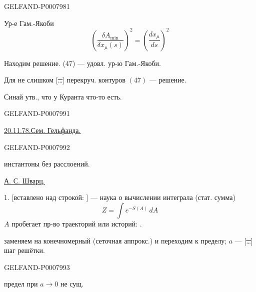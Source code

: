 \begin{GelfandAdjacentEvidence}{GELFAND-P000798}{1}

Ур-е Гам.-Якоби
\[
\left(\frac{\delta A_{\min}}{\delta x_\mu(s)}\right)^2
=\left(\frac{dx_\mu}{ds}\right)^2
\]

Находим решение. (47) --- удовл. ур-ю Гам.-Якоби.

Для не слишком [\sout{\ldots}] перекруч. контуров \((47)\) --- решение.
\end{GelfandAdjacentEvidence}


Синай утв., что у Куранта что-то есть.


\begin{GelfandAdjacentEvidence}{GELFAND-P000799}{1}

\underline{\underline{20.11.78.}}\qquad\underline{\underline{Сем. Гельфанда.}}

\SourceFigure{GELFAND-P000799}{palindrome-bracket}{%
\par\noindent
\(\left.\vcenter{\hbox{\scriptsize\shortstack[l]{%
«Торт с кофе не фокстрот»\\
«Сенсация: поп яйца снес»\\
«Я иду с мечем судия»}}}\right]\)
\enspace{\scriptsize\uwave{Палиндромы.}}
}
\end{GelfandAdjacentEvidence}
\begin{GelfandAdjacentEvidence}{GELFAND-P000799}{2}


 инстантоны без расслоений.

\underline{\underline{А. С. Шварц.}}

1.  [вставлено над строкой: ]
 --- наука о вычислении интеграла (стат. сумма)
\begin{equation*}
Z=\int e^{-S(A)}\,dA
\tag{1}
\end{equation*}
\(A\) пробегает пр-во траекторий или историй: .

 заменяем на конечномерный (сеточная аппрокс.) и переходим к пределу; \(a\) --- [\sout{\ldots}] шаг решётки.
\end{GelfandAdjacentEvidence}
\begin{GelfandAdjacentEvidence}{GELFAND-P000799}{3}


 предел при \(a\to0\) не сущ.
\end{GelfandAdjacentEvidence}
